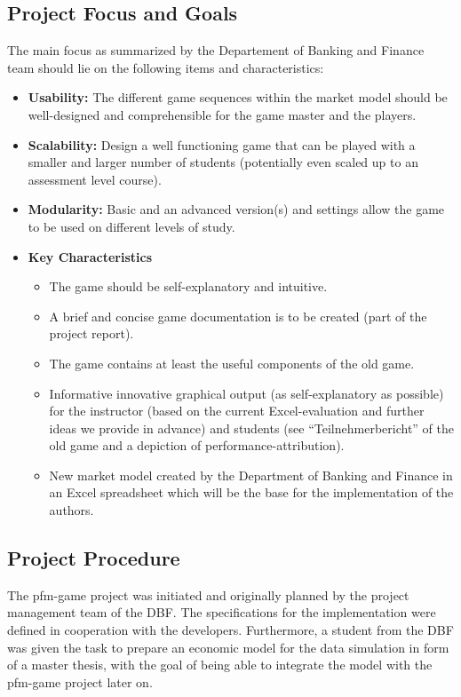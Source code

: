 \subsection{Project Focus and Goals}
The main focus as summarized by the Departement of Banking and Finance team should lie on the following items and characteristics:
\begin{itemize}
  \item \textbf{Usability:} The different game sequences within the market model should be well-designed and comprehensible for the game master and the players.
  \item \textbf{Scalability:} Design a well functioning game that can be played with a smaller and larger number of students (potentially even scaled up to an assessment level course).
  \item \textbf{Modularity:} Basic and an advanced version(s) and settings allow the game to be used on different levels of study.
  \item \textbf{Key Characteristics}
  \begin{itemize}
    \item The game should be self-explanatory and intuitive.
    \item A brief and concise game documentation is to be created (part of the project report).
    \item The game contains at least the useful components of the old game.
    \item Informative innovative graphical output (as self-explanatory as possible) for the instructor (based on the current Excel-evaluation and further ideas we provide in advance) and students (see ``Teilnehmerbericht'' of the old game and a depiction of performance-attribution).
    \item New market model created by the Department of Banking and Finance in an Excel spreadsheet which will be the base for the implementation of the authors.
  \end{itemize}
\end{itemize}



\subsection{Project Procedure}
The pfm-game project was initiated and originally planned by the project management team of the DBF. The specifications for the implementation were defined in cooperation with the developers. Furthermore, a student from the DBF was given the task to prepare an economic model for the data simulation in form of a master thesis, with the goal of being able to integrate the model with the pfm-game project later on.\\

